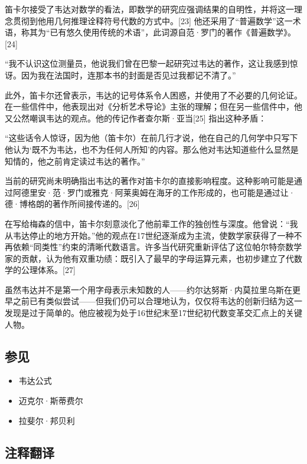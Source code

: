 笛卡尔接受了韦达对数学的看法，即数学的研究应强调结果的自明性，并将这一理念贯彻到他用几何推理诠释符号代数的方式中。[23] 他还采用了“普遍数学”这一术语，称其为“已有悠久使用传统的术语”，此词源自范·罗门的著作《普遍数学》。[24]

“我不认识这位测量员，他说我们曾在巴黎一起研究过韦达的著作，这让我感到惊讶。因为我在法国时，连那本书的封面是否见过我都记不清了。”

此外，笛卡尔还曾表示，韦达的记号体系令人困惑，并使用了不必要的几何论证。在一些信件中，他表现出对《分析艺术导论》主张的理解；但在另一些信件中，他又公然嘲讽韦达的观点。他的传记作者查尔斯·亚当[25] 指出这种矛盾：

“这些话令人惊讶，因为他（笛卡尔）在前几行才说，他在自己的几何学中只写下他认为‘既不为韦达，也不为任何人所知’的内容。那么他对韦达知道些什么显然是知情的，他之前肯定读过韦达的著作。”

当前的研究尚未明确指出韦达的著作对笛卡尔的直接影响程度。这种影响可能是通过阿德里安·范·罗门或雅克·阿莱奥姆在海牙的工作形成的，也可能是通过让·德·博格朗的著作所间接传递的。[26]

在写给梅森的信中，笛卡尔刻意淡化了他前辈工作的独创性与深度。他曾说：“我从韦达停止的地方开始。”他的观点在17世纪逐渐成为主流，使数学家获得了一种不再依赖“同类性”约束的清晰代数语言。许多当代研究重新评估了这位帕尔特奈数学家的贡献，认为他有双重功绩：既引入了最早的字母运算元素，也初步建立了代数学的公理体系。[27]

虽然韦达并不是第一个用字母表示未知数的人——约尔达努斯·内莫拉里乌斯在更早之前已有类似尝试——但我们仍可以合理地认为，仅仅将韦达的创新归结为这一发现是过于简单的。他应被视为处于16世纪末至17世纪初代数变革交汇点上的关键人物。
\subsection{参见}
\begin{itemize}
\item 韦达公式
\item 迈克尔·斯蒂费尔
\item 拉斐尔·邦贝利
\end{itemize}
\subsection{注释翻译}

